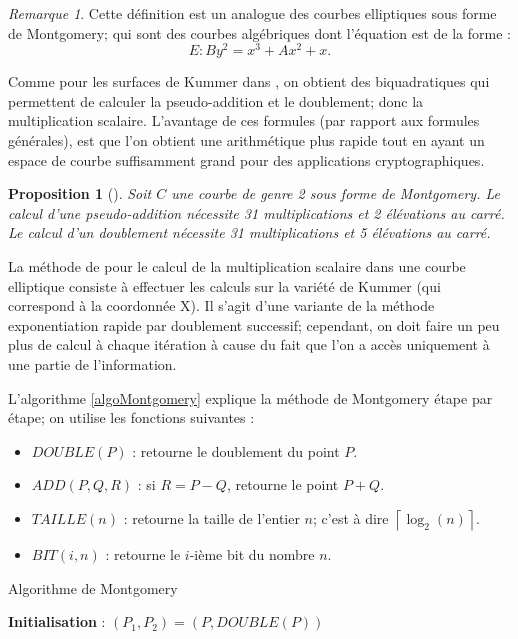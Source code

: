 \documentclass[a4paper]{article}
\newtheorem{proposition}[theoreme]{Proposition}
\theoremstyle{definition}
\theoremstyle{remark}
\newtheorem{remarque}{Remarque}
\numberwithin{equation}{section}
\begin{document}
\begin{remarque}
Cette définition est un analogue des courbes elliptiques sous forme de Montgomery; qui sont des courbes algébriques dont l'équation est de la forme :
$$E : By^2 = x^3 + Ax^2 + x.$$
\end{remarque}

Comme pour les surfaces de Kummer dans \citep{cassels-Flynn}, on obtient des biquadratiques qui permettent de calculer la pseudo-addition et le doublement; donc la multiplication scalaire. L'avantage de ces formules (par rapport aux formules générales), est que l'on obtient une arithmétique plus rapide tout en ayant un espace de courbe suffisamment grand pour des applications cryptographiques.

\begin{proposition}[\citet{duquesne}]
\label{propDuquesne}
Soit $C$ une courbe de genre 2 sous forme de Montgomery. Le calcul d'une pseudo-addition nécessite 31 multiplications et 2 élévations au carré. Le calcul d'un doublement nécessite 31 multiplications et 5 élévations au carré.
\end{proposition}

La méthode de \citet{montgomery} pour le calcul de la multiplication scalaire dans une courbe elliptique consiste à effectuer les calculs sur la variété de Kummer (qui correspond à la coordonnée X). Il s'agit d'une variante de la méthode exponentiation rapide par doublement successif; cependant, on doit faire un peu plus de calcul à chaque itération à cause du fait que l'on a accès uniquement à une partie de l'information.

L'algorithme \ref{algoMontgomery} explique la méthode de Montgomery étape par étape; on utilise les fonctions suivantes :
\begin{itemize}
\item $DOUBLE(P)$ : retourne le doublement du point $P$.
\item $ADD(P,Q,R)$ : si $R = P-Q$, retourne le point $P+Q$.
\item $TAILLE(n)$ : retourne la taille de l'entier $n$; c'est à dire $\left \lceil{\log_2(n)}\right \rceil$.
\item $BIT(i,n)$ : retourne le $i$-ième bit du nombre $n$.
\end{itemize}

\begin{algorithm}
\label{algoMontgomery}
\caption{Algorithme de Montgomery}
\textbf{Initialisation} : $(P_1,P_2) = (P,DOUBLE(P))$
\BlankLine
{}
\end{algorithm}
\end{document}
